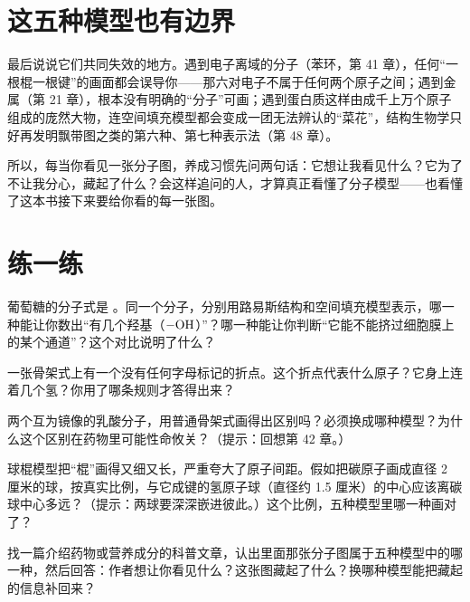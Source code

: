 \section{这五种模型也有边界}

最后说说它们共同失效的地方。遇到电子离域的分子（苯环，第 41 章），任何“一根棍一根键”的画面都会误导你——那六对电子不属于任何两个原子之间；遇到金属（第 21 章），根本没有明确的“分子”可画；遇到蛋白质这样由成千上万个原子组成的庞然大物，连空间填充模型都会变成一团无法辨认的“菜花”，结构生物学只好再发明飘带图之类的第六种、第七种表示法（第 48 章）。

所以，每当你看见一张分子图，养成习惯先问两句话：它想让我看见什么？它为了不让我分心，藏起了什么？会这样追问的人，才算真正看懂了分子模型——也看懂了这本书接下来要给你看的每一张图。

\section*{练一练}

\begin{sikaoti}
\item 葡萄糖的分子式是 。同一个分子，分别用路易斯结构和空间填充模型表示，哪一种能让你数出“有几个羟基（$-\mathrm{OH}$）”？哪一种能让你判断“它能不能挤过细胞膜上的某个通道”？这个对比说明了什么？
\item 一张骨架式上有一个没有任何字母标记的折点。这个折点代表什么原子？它身上连着几个氢？你用了哪条规则才答得出来？
\item 两个互为镜像的乳酸分子，用普通骨架式画得出区别吗？必须换成哪种模型？为什么这个区别在药物里可能性命攸关？（提示：回想第 42 章。）
\item 球棍模型把“棍”画得又细又长，严重夸大了原子间距。假如把碳原子画成直径 2 厘米的球，按真实比例，与它成键的氢原子球（直径约 1.5 厘米）的中心应该离碳球中心多远？（提示：两球要深深嵌进彼此。）这个比例，五种模型里哪一种画对了？
\item 找一篇介绍药物或营养成分的科普文章，认出里面那张分子图属于五种模型中的哪一种，然后回答：作者想让你看见什么？这张图藏起了什么？换哪种模型能把藏起的信息补回来？
\end{sikaoti}
